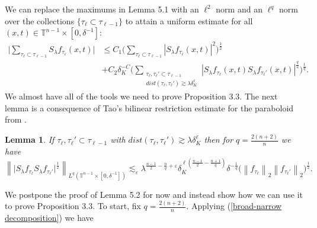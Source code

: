 \documentclass[11pt]{amsart}
\numberwithin{equation}{section}
\newcommand{\Tn}{\mathbb{T}^{n-1}}
\newcommand{\la}{\lambda}
\newcommand\norm[1]{\left\lVert#1\right\rVert}
\newcommand{\lpnorm}[3]{\norm{#1}_{L^{#2}(#3)}}
\newcommand{\altlpnorm}[2]{\norm{#1}_{#2}}
\newcommand{\Sl}{S_{\la}}
\newcommand{\dK}[1]{\delta_{K}^{#1}}
\newtheorem{lemma}[theorem]{Lemma}
\begin{document}
We can replace the maximums in Lemma 5.1 with an $\ell^2$ norm and an $\ell^{q}$ norm over the collections $\{\tau_{\ell} \subset \tau_{\ell - 1}\}$ to attain a uniform estimate for all $(x,t) \in \Tn\times[0, \delta^{-1}]$:
\begin{equation} \label{broad-narrow decomposition}
\begin{split}
    \Big|\sum_{\tau_{\ell} \subset \tau_{\ell - 1}}\Sl f_{\tau_{\ell}}(x,t)\Big| &\leq C_1 \Big( \sum_{\tau_{\ell} \subset \tau_{\ell - 1}}|\Sl f_{\tau_{\ell}}(x,t) |^2 \Big)^{\frac{1}{2}} \\
    &+ C_2 \dK{-C}\Big(\sum_{\substack{\tau_{\ell},\tau_{\ell}' \subset \tau_{\ell - 1} \\ dist(\tau_{\ell}, \tau_{\ell}') \gtrsim \la \dK{\ell}}}|\Sl f_{\tau_{\ell}}(x,t)\Sl f_{\tau_{\ell}'}(x,t)|^{\frac{q}{2}}\Big)^{\frac{1}{q}}.
\end{split} 
\end{equation}
We almost have all of the tools we need to prove Proposition 3.3. The next lemma is a consequence of Tao's bilinear restriction estimate for the paraboloid from \cite{taobilinear}.

\begin{lemma} If $\tau_{\ell}, \tau_{\ell}' \subset \tau_{\ell - 1}$ with $dist(\tau_{\ell}, \tau_{\ell}') \gtrsim \la \dK{\ell}$ then for $q = \frac{2(n+2)}{n}$ we have
\begin{equation}
    \lpnorm{\big|\Sl f_{\tau_{\ell}}\Sl f_{\tau_{\ell}'}\big|^{\frac{1}{2}}}{q}{\Tn\times[0,\delta^{-1}]} \lesssim_{\varepsilon} \la^{\frac{n-1}{2} -\frac{n}{q} + \varepsilon }\dK{\ell(\frac{n-1}{2} - \frac{n+1}{q})} \delta^{-\frac{1}{q}} \Big(\altlpnorm{f_{\tau_{\ell}}}{2}\altlpnorm{f_{\tau_{\ell}'}}{2}\Big)^{\frac{1}{2}}.
\end{equation}
\end{lemma}
We postpone the proof of Lemma 5.2 for now and instead show how we can use it to prove Proposition 3.3. To start, fix $q = \frac{2(n+2)}{n}$. Applying (\ref{broad-narrow decomposition}) we have
\end{document}
